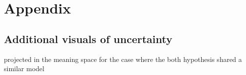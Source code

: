 \renewcommand{\chapterpath}{appendix}
\renewcommand{\imgpath}{appendix/img}

\chapter{Appendix}
\label{chapter:Appendix}

\section{Additional visuals of uncertainty}

projected in the meaning space for the case where the both hypothesis shared a similar model